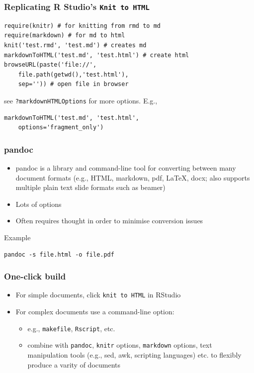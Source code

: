 \begin{frame}[fragile]\frametitle{Replicating R Studio's
\texttt{Knit to HTML}}

\begin{verbatim}
require(knitr) # for knitting from rmd to md
require(markdown) # for md to html 
knit('test.rmd', 'test.md') # creates md 
markdownToHTML('test.md', 'test.html') # create html
browseURL(paste('file://', 
    file.path(getwd(),'test.html'), 
    sep='')) # open file in browser
\end{verbatim}

see \texttt{?markdownHTMLOptions} for more options. E.g.,

\begin{verbatim}
markdownToHTML('test.md', 'test.html', 
    options='fragment_only')
\end{verbatim}

\end{frame}

\begin{frame}[fragile]\frametitle{pandoc}

\begin{itemize}
\item
  pandoc is a library and command-line tool for converting between many
  document formats (e.g., HTML, markdown, pdf, LaTeX, docx; also
  supports multiple plain text slide formats such as beamer)
\item
  Lots of options
\item
  Often requires thought in order to minimise conversion issues
\end{itemize}

\begin{block}{Example}

\begin{verbatim}
pandoc -s file.html -o file.pdf
\end{verbatim}

\end{block}

\end{frame}

\begin{frame}[fragile]\frametitle{One-click build}

\begin{itemize}
\item
  For simple documents, click \texttt{knit to HTML} in RStudio
\item
  For complex documents use a command-line option:

  \begin{itemize}
  \item
    e.g., \texttt{makefile}, \texttt{Rscript}, etc.
  \item
    combine with \texttt{pandoc}, \texttt{knitr} options,
    \texttt{markdown} options, text manipulation tools (e.g., sed, awk,
    scripting languages) etc. to flexibly produce a varity of documents
  \end{itemize}
\end{itemize}

\end{frame}

